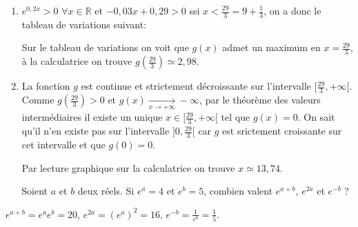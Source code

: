 \documentclass[a4paper,12pt]{exam}
\newcommand{\exercice}[2]{\qformat{\textbf{Exercice \thequestion}#1\hfill\textbf{#2}}\question\ }
\newcommand{\exop}[1]{\exercice{}{#1pt}}
\begin{document}
\begin{questions}
\begin{solution}
\begin{enumerate}
\begin{enumerate}
\item $e^{0{,}2x}>0$ $\forall x\in\mathbb R$ et $-0{,}03x+0{,}29>0$ ssi $x<\tfrac{29}3=9+\tfrac13$, on a donc le tableau de variations suivant:
\begin{center}\end{center}
Sur le tableau de variations on voit que $g(x)$ admet un maximum en $x=\tfrac{29}3$, à la calculatrice on trouve $g(\tfrac{29}3)\simeq2{,}98$.
\item La fonction $g$ est continue et strictement décroissante sur l'intervalle $[\tfrac{29}3,+\infty[$. Comme $g(\tfrac{29}3)>0$ et $g(x)\xrightarrow[x\rightarrow+\infty]{}-\infty$, par le théorème des valeurs intermédiaires il existe un unique $x\in[\tfrac{29}3,+\infty[$ tel que $g(x)=0$. On sait qu'il n'en existe pas sur l'intervalle $]0,\tfrac{29}3[$ car $g$ est srictement croissante sur cet intervalle et que $g(0)=0$.

Par lecture graphique sur la calculatrice on trouve $x\simeq13{,}74$.
\end{enumerate}
\end{enumerate}
\end{solution}
\ \vfill
\exop{3}
Soient $a$ et $b$ deux réels. Si $e^a=4$ et $e^b=5$, combien valent $e^{a+b}$, $e^{2a}$ et $e^{-b}$ ?
\begin{solution}
 $e^{a+b}=e^ae^b=20$, $e^{2a}=(e^a)^2=16$, $e^{-b}=\tfrac1{e^b}=\tfrac15$.
\end{solution}
\end{questions}
\end{document}
